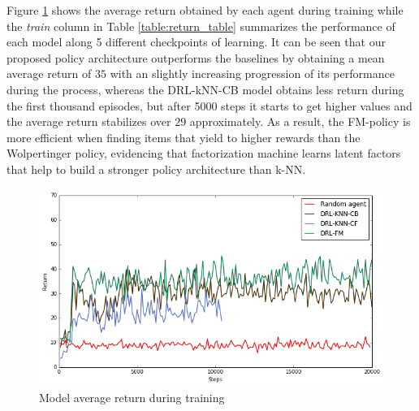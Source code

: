 Figure \ref{fig:return_train} shows the average return obtained by each agent during training while the \textit{train} column in Table \ref{table:return_table} summarizes the performance of each model along 5 different checkpoints of learning. It can be seen that our proposed policy architecture outperforms the baselines by obtaining a mean average return of $35$ with an slightly increasing progression of its performance during the process, whereas the DRL-kNN-CB model obtains less return during the first thousand episodes, but after 5000 steps it starts to get higher values and the average return stabilizes over $29$ approximately. As a result, the FM-policy is more efficient when finding items that yield to higher rewards than the Wolpertinger policy, evidencing that factorization machine learns latent factors that help to build a stronger policy architecture than k-NN.
%

\begin{figure}[t]
\centering
\includegraphics[scale=0.6]{images/eval_return_train}
\caption[Model average return during training]{Model average return during training}
\label{fig:return_train}
\end{figure}

